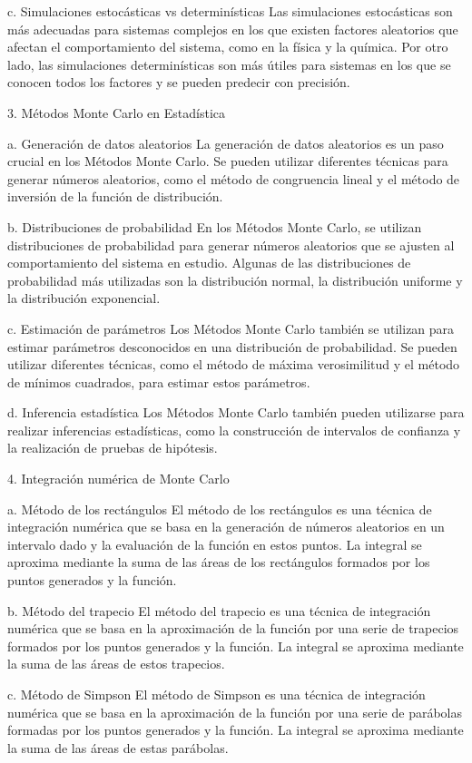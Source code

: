 c. Simulaciones estocásticas vs determinísticas
Las simulaciones estocásticas son más adecuadas para sistemas complejos en los que existen factores aleatorios que afectan el comportamiento del sistema, como en la física y la química. Por otro lado, las simulaciones determinísticas son más útiles para sistemas en los que se conocen todos los factores y se pueden predecir con precisión.

3. Métodos Monte Carlo en Estadística

a. Generación de datos aleatorios
La generación de datos aleatorios es un paso crucial en los Métodos Monte Carlo. Se pueden utilizar diferentes técnicas para generar números aleatorios, como el método de congruencia lineal y el método de inversión de la función de distribución.

b. Distribuciones de probabilidad
En los Métodos Monte Carlo, se utilizan distribuciones de probabilidad para generar números aleatorios que se ajusten al comportamiento del sistema en estudio. Algunas de las distribuciones de probabilidad más utilizadas son la distribución normal, la distribución uniforme y la distribución exponencial.

c. Estimación de parámetros
Los Métodos Monte Carlo también se utilizan para estimar parámetros desconocidos en una distribución de probabilidad. Se pueden utilizar diferentes técnicas, como el método de máxima verosimilitud y el método de mínimos cuadrados, para estimar estos parámetros.

d. Inferencia estadística
Los Métodos Monte Carlo también pueden utilizarse para realizar inferencias estadísticas, como la construcción de intervalos de confianza y la realización de pruebas de hipótesis.

4. Integración numérica de Monte Carlo

a. Método de los rectángulos
El método de los rectángulos es una técnica de integración numérica que se basa en la generación de números aleatorios en un intervalo dado y la evaluación de la función en estos puntos. La integral se aproxima mediante la suma de las áreas de los rectángulos formados por los puntos generados y la función.

b. Método del trapecio
El método del trapecio es una técnica de integración numérica que se basa en la aproximación de la función por una serie de trapecios formados por los puntos generados y la función. La integral se aproxima mediante la suma de las áreas de estos trapecios.

c. Método de Simpson
El método de Simpson es una técnica de integración numérica que se basa en la aproximación de la función por una serie de parábolas formadas por los puntos generados y la función. La integral se aproxima mediante la suma de las áreas de estas parábolas.

